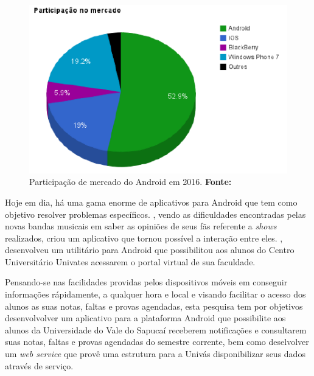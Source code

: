 	\begin{figure}[h!]
		\centerline{\includegraphics[scale=1]{./imagens/0_introducao/introducao.png}}
		\caption[Participação de mercado do Android em 2016]{Participação de
		mercado do Android em 2016.
		\textbf{Fonte:}}
		\label{fig:intro}
	\end{figure}

	\par Hoje em dia, há uma gama enorme de aplicativos para Android que tem como
objetivo resolver problemas específicos. , vendo as
dificuldades encontradas pelas novas bandas musicais em saber as opiniões de
seus fãs referente a \textit{shows} realizados, criou um aplicativo que tornou
possível a interação entre eles. , desenvolveu um
utilitário para Android que possibilitou aos alunos do Centro Universitário
Univates acessarem o portal virtual de sua faculdade.


	\par Pensando-se nas facilidades providas pelos dispositivos móveis em
conseguir informações rápidamente, a qualquer hora e local e visando facilitar
o acesso dos alunos as suas notas, faltas e provas agendadas, esta pesquisa tem
por objetivos desenvolvolver um aplicativo para a plataforma Android que
possibilite aos alunos da Universidade do Vale do Sapucaí receberem
notificações e consultarem suas notas, faltas e provas agendadas do semestre
corrente, bem como deselvolver um \textit{web service} que provê uma estrutura
para a Univás disponibilizar seus dados através de serviço.

	
